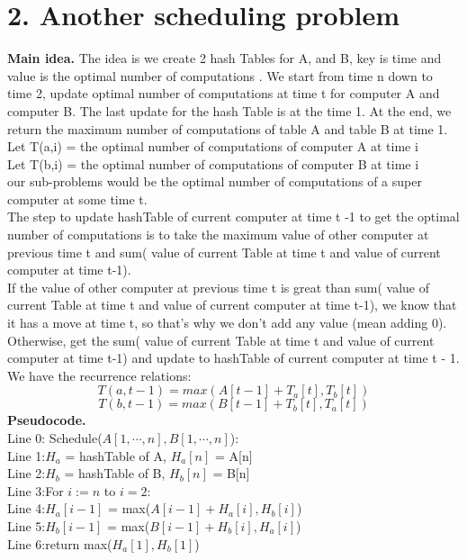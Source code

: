 \documentclass[11pt]{article}
\newcommand{\tab}{\hspace*{2em}}
\begin{document}
\section*{2. Another scheduling problem}
\noindent
\textbf{Main idea.}
The idea is we create 2 hash Tables for A, and B, key is time and value is the optimal number of computations . We start from time n down to time 2, update optimal number of computations at time t for computer A and computer B. The last update for the hash Table is at the time 1. At the end, we return the maximum number of computations of table A and table B at time 1.\\
Let T(a,i) = the optimal number of computations of computer A at time i\\
Let T(b,i) = the optimal number of computations of computer B at time i\\
our sub-problems would be the optimal number of computations of a super computer at some time t.\\
The step to update hashTable of current computer at time t -1 to get the optimal number of computations is to take the maximum value of other computer at previous time t and sum( value of current Table at time t and value of current computer at time t-1).\\
If the value of other computer at previous time t is great than sum( value of current Table at time t and value of current computer at time t-1), we know that it has a move at time t, so that's why we don't add any value (mean adding 0).\\
Otherwise, get the sum( value of current Table at time t and value of current computer at time t-1) and update to hashTable of current computer at time t - 1.\\
We have the recurrence relations:\\
$$T(a,t-1) = max(A[t-1] + T_a[t], T_b[t])$$
$$T(b,t-1) = max(B[t-1] + T_b[t], T_a[t])$$
\noindent
\textbf{Pseudocode.}\\
Line 0: Schedule($A[1,\cdots, n], B[1,\cdots, n]$):\\
Line 1:\tab $H_a$ = hashTable of A, $H_a[n]$ = A[n]\\
Line 2:\tab $H_b$ = hashTable of B, $H_b[n]$ = B[n]\\
Line 3:\tab For $i:= n$ to $i = 2$: \\
Line 4:\tab\tab $H_a[i-1]$ = max($A[i-1] + H_a[i], H_b[i]$)\\
Line 5:\tab\tab $H_b[i-1]$ = max($B[i-1] + H_b[i], H_a[i]$)\\
Line 6:\tab return max($H_a[1], H_b[1]$)\\
\end{document}
